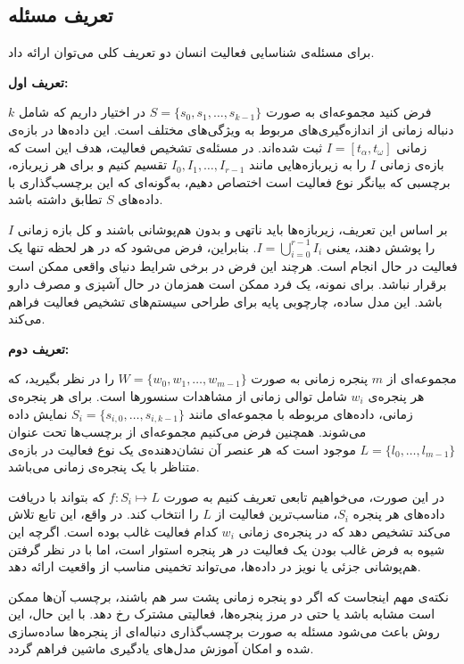 \subsection{تعریف مسئله}

برای مسئله‌ی شناسایی فعالیت انسان دو تعریف کلی می‌توان ارائه داد.

\noindent\textbf{تعریف اول:}


فرض کنید مجموعه‌ای به صورت \( S = \{s_0, s_1, \ldots, s_{k-1}\} \) در اختیار داریم که شامل \(k\) دنباله زمانی از اندازه‌گیری‌های مربوط به ویژگی‌های مختلف است. این داده‌ها در بازه‌ی زمانی \( I = [t_{\alpha}, t_{\omega}] \) ثبت شده‌اند. در مسئله‌ی تشخیص فعالیت، هدف این است که بازه‌ی زمانی \( I \) را به زیربازه‌هایی مانند \( I_0, I_1, \ldots, I_{r-1} \) تقسیم کنیم و برای هر زیربازه، برچسبی که بیانگر نوع فعالیت است اختصاص دهیم، به‌گونه‌ای که این برچسب‌گذاری با داده‌های \( S \) تطابق داشته باشد.

بر اساس این تعریف، زیربازه‌ها باید ناتهی و بدون هم‌پوشانی باشند و کل بازه زمانی \( I \) را پوشش دهند، یعنی \( I = \bigcup_{i=0}^{r-1} I_i \). بنابراین، فرض می‌شود که در هر لحظه تنها یک فعالیت در حال انجام است. هرچند این فرض در برخی شرایط دنیای واقعی ممکن است برقرار نباشد. برای نمونه، یک فرد ممکن است همزمان در حال آشپزی و مصرف دارو باشد. این مدل ساده، چارچوبی پایه برای طراحی سیستم‌های تشخیص فعالیت فراهم می‌کند.



\noindent\textbf{تعریف دوم:}


مجموعه‌ای از \( m \) پنجره زمانی به صورت \( W = \{w_0, w_1, \ldots, w_{m-1}\} \) را در نظر بگیرید، که هر پنجره‌ی \( w_i \) شامل توالی زمانی از مشاهدات سنسورها است. برای هر پنجره‌ی زمانی، داده‌های مربوطه با مجموعه‌ای مانند \( S_i = \{s_{i,0}, \ldots, s_{i,k-1}\} \) نمایش داده می‌شوند. همچنین فرض می‌کنیم مجموعه‌ای از برچسب‌ها تحت عنوان \( L = \{l_0, \ldots, l_{m-1}\} \) موجود است که هر عنصر آن نشان‌دهنده‌ی یک نوع فعالیت در بازه‌ی متناظر با یک پنجره‌ی زمانی می‌باشد.

در این صورت، می‌خواهیم تابعی تعریف کنیم به صورت \( f: S_i \mapsto L \) که بتواند با دریافت داده‌های هر پنجره \( S_i \)، مناسب‌ترین فعالیت از \( L \) را انتخاب کند. در واقع، این تابع تلاش می‌کند تشخیص دهد که در پنجره‌ی زمانی \( w_i \) کدام فعالیت غالب بوده است. اگرچه این شیوه به فرض غالب بودن یک فعالیت در هر پنجره استوار است، اما با در نظر گرفتن هم‌پوشانی جزئی یا نویز در داده‌ها، می‌تواند تخمینی مناسب از واقعیت ارائه دهد.

نکته‌ی مهم اینجاست که اگر دو پنجره زمانی پشت سر هم باشند، برچسب آن‌ها ممکن است مشابه باشد یا حتی در مرز پنجره‌ها، فعالیتی مشترک رخ دهد. با این حال، این روش باعث می‌شود مسئله به صورت برچسب‌گذاری دنباله‌ای از پنجره‌ها ساده‌سازی شده و امکان آموزش مدل‌های یادگیری ماشین فراهم گردد.

